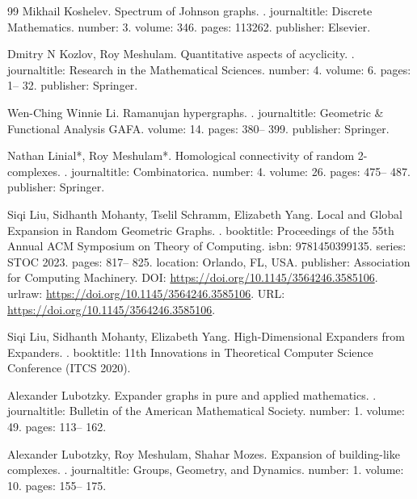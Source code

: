 \documentclass[10pt,a4paper]{article}
\theoremstyle{definition}
\theoremstyle{remark}
\numberwithin{equation}{section}
\begin{document}
\begin{thebibliography}{99}
Mikhail Koshelev.
\newblock Spectrum of Johnson graphs.
.
\newblock journaltitle: Discrete Mathematics.
\newblock number: 3.
\newblock volume: 346.
\newblock pages: 113262.
\newblock publisher: Elsevier.

Dmitry N Kozlov, Roy Meshulam.
\newblock Quantitative aspects of acyclicity.
.
\newblock journaltitle: Research in the Mathematical Sciences.
\newblock number: 4.
\newblock volume: 6.
\newblock pages: 1-- 32.
\newblock publisher: Springer.

Wen-Ching Winnie Li.
\newblock Ramanujan hypergraphs.
.
\newblock journaltitle: Geometric \& Functional Analysis GAFA.
\newblock volume: 14.
\newblock pages: 380-- 399.
\newblock publisher: Springer.

Nathan Linial*, Roy Meshulam*.
\newblock Homological connectivity of random 2-complexes.
.
\newblock journaltitle: Combinatorica.
\newblock number: 4.
\newblock volume: 26.
\newblock pages: 475-- 487.
\newblock publisher: Springer.

Siqi Liu, Sidhanth Mohanty, Tselil Schramm, Elizabeth Yang.
\newblock Local and Global Expansion in Random Geometric Graphs.
.
\newblock booktitle: Proceedings of the 55th Annual ACM Symposium on Theory of Computing.
\newblock isbn: 9781450399135.
\newblock series: STOC 2023.
\newblock pages: 817-- 825.
\newblock location: Orlando, FL, USA.
\newblock publisher: Association for Computing Machinery.
\newblock DOI: \url{https://doi.org/10.1145/3564246.3585106}.
\newblock urlraw: \url{https://doi.org/10.1145/3564246.3585106}.
\newblock URL: \url{https://doi.org/10.1145/3564246.3585106}.

Siqi Liu, Sidhanth Mohanty, Elizabeth Yang.
\newblock High-Dimensional Expanders from Expanders.
.
\newblock booktitle: 11th Innovations in Theoretical Computer Science Conference (ITCS 2020).

Alexander Lubotzky.
\newblock Expander graphs in pure and applied mathematics.
.
\newblock journaltitle: Bulletin of the American Mathematical Society.
\newblock number: 1.
\newblock volume: 49.
\newblock pages: 113-- 162.

Alexander Lubotzky, Roy Meshulam, Shahar Mozes.
\newblock Expansion of building-like complexes.
.
\newblock journaltitle: Groups, Geometry, and Dynamics.
\newblock number: 1.
\newblock volume: 10.
\newblock pages: 155-- 175.


\end{thebibliography}
\end{document}

